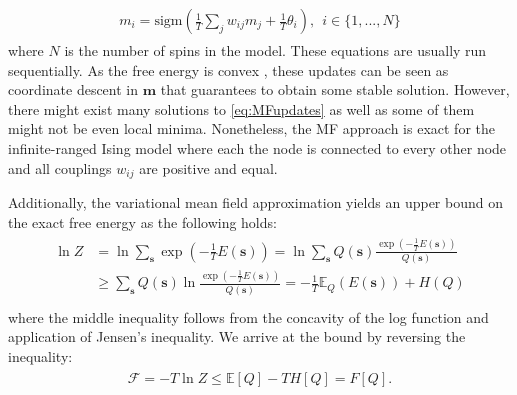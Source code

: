 \begin{align}
\begin{split}
m_i = \text{sigm}\left(\frac{1}{T}\sum_j w_{ij}m_j + \frac{1}{T} \theta_i \right), ~~ i \in \{1, ..., N\}
\label{eq:MFupdates}
\end{split}
\end{align}
where $N$ is the number of spins in the model. These equations are usually run sequentially. As the free energy is convex \cite{wainwright2008graphical}, these updates can be seen as coordinate descent in $\mathbf{m}$ that guarantees to obtain some stable solution. However, there might exist many solutions to \ref{eq:MFupdates} as well as some of them might not be even local minima. Nonetheless, the MF approach is exact for the infinite-ranged Ising model where each the node is connected to every other node and all couplings $w_{ij}$ are positive and equal\cite{kirkpatrick1978infinite}.

Additionally, the variational mean field approximation yields an upper bound on the exact free energy as the following holds:
\begin{align}
\begin{split}
\ln Z & = \ln \sum_{\mathbf{s}} \exp(-\frac{1}{T}E(\mathbf{s}))= \ln  \sum_{\mathbf{s}} Q(\mathbf{s}) \frac{ \exp(-\frac{1}{T}E(\mathbf{s}))}{Q(\mathbf{s})} \\
& \geqslant  \sum_{\mathbf{s}} Q(\mathbf{s}) \ln  \frac{ \exp(-\frac{1}{T}E(\mathbf{s}))}{Q(\mathbf{s})} = -\frac{1}{T}\mathbb{E}_Q(E(\mathbf{s})) + H(Q)\\
\end{split}
\end{align}
where the middle inequality follows from the concavity of the log function and application of Jensen's inequality. We arrive at the bound by reversing the inequality:
\begin{align}
\begin{split}
\mathcal{F} = - T \ln Z \leqslant \mathbb{E}[Q] - TH[Q] = F[Q].
\end{split}
\end{align}
